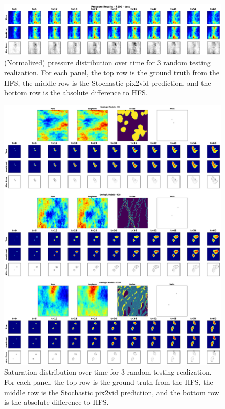 \documentclass[10pt, twoside]{article}
\begin{document}
\begin{figure}
    \centering
    \includegraphics[width=16cm]{figures/test_pres.png}
    \caption{(Normalized) pressure distribution over time for 3 random testing realization. For each panel, the top row is the ground truth from the HFS, the middle row is the Stochastic pix2vid prediction, and the bottom row is the absolute difference to HFS.}
    \label{test_pres}
\end{figure}

\begin{figure}
    \centering
    \includegraphics[width=16cm]{figures/test_sat.png}
    \caption{Saturation distribution over time for 3 random testing realization. For each panel, the top row is the ground truth from the HFS, the middle row is the Stochastic pix2vid prediction, and the bottom row is the absolute difference to HFS.}
    \label{test_sat}
\end{figure}
\end{document}
